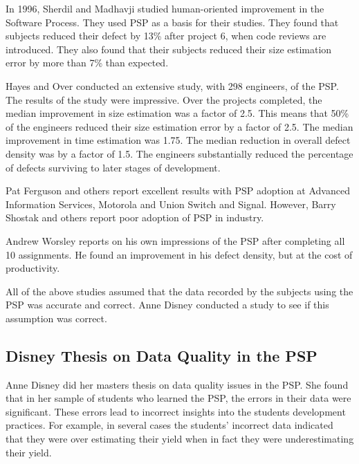 In 1996, Sherdil and Madhavji studied human-oriented improvement in the
Software Process\cite{Sherdil96}. They used PSP as a basis for their studies.
They found that subjects reduced their defect by 13\% after project 6, when
code reviews are introduced. They also found that their subjects reduced their
size estimation error by more than 7\% than expected.

Hayes and Over conducted an extensive study, with 298 engineers, of the
PSP\cite{Hayes97}.  The results of the study were impressive. Over the projects
completed, the median improvement in size estimation was a factor of 2.5.  This
means that 50\% of the engineers reduced their size estimation error by a
factor of 2.5.  The median improvement in time estimation was 1.75.  The median 
reduction in overall defect density was by a factor of 1.5.  The engineers
substantially reduced the percentage of defects surviving to later stages of
development. 

Pat Ferguson and others report excellent results with PSP adoption at Advanced
Information Services, Motorola and Union Switch and Signal\cite{Ferguson97}.
However, Barry Shostak and others report poor adoption of PSP in
industry\cite{Shostak96,Emam96}.

Andrew Worsley reports on his own impressions of the PSP after completing all
10 assignments\cite{Worsley96}.  He found an improvement in his defect density, 
but at the cost of productivity.

All of the above studies assumed that the data recorded by the subjects using
the PSP was accurate and correct.  Anne Disney conducted a study to see if this 
assumption was correct. 

\subsection{Disney Thesis on Data Quality in the PSP}

Anne Disney did her masters thesis on data quality issues in the PSP.  She
found that in her sample of students who learned the PSP, the errors in their data
were significant.  These errors lead to incorrect insights into the students
development practices.  For example, in several cases the students' incorrect data indicated
that they were over estimating their yield when in fact they were
underestimating their yield.

